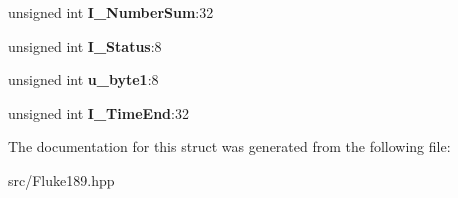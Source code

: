 \begin{DoxyCompactItemize}
\item 
\hypertarget{structFluke_1_1Fluke189_1_1qd2__set__t_af0bda7603f3d0d7cf118bf76eed03b20}{
unsigned int {\bfseries I\_\-NumberSum}:32}
\label{structFluke_1_1Fluke189_1_1qd2__set__t_af0bda7603f3d0d7cf118bf76eed03b20}

\item 
\hypertarget{structFluke_1_1Fluke189_1_1qd2__set__t_ae3cb77ee73c195ffc5bac75faf6e5751}{
unsigned int {\bfseries I\_\-Status}:8}
\label{structFluke_1_1Fluke189_1_1qd2__set__t_ae3cb77ee73c195ffc5bac75faf6e5751}

\item 
\hypertarget{structFluke_1_1Fluke189_1_1qd2__set__t_aec78e59ad38fbd0916f0632ed1c1bf4b}{
unsigned int {\bfseries u\_\-byte1}:8}
\label{structFluke_1_1Fluke189_1_1qd2__set__t_aec78e59ad38fbd0916f0632ed1c1bf4b}

\item 
\hypertarget{structFluke_1_1Fluke189_1_1qd2__set__t_a57828e561ec4f5c8690868f9e74cab8c}{
unsigned int {\bfseries I\_\-TimeEnd}:32}
\label{structFluke_1_1Fluke189_1_1qd2__set__t_a57828e561ec4f5c8690868f9e74cab8c}

\end{DoxyCompactItemize}


The documentation for this struct was generated from the following file:\begin{DoxyCompactItemize}
\item 
src/Fluke189.hpp\end{DoxyCompactItemize}
